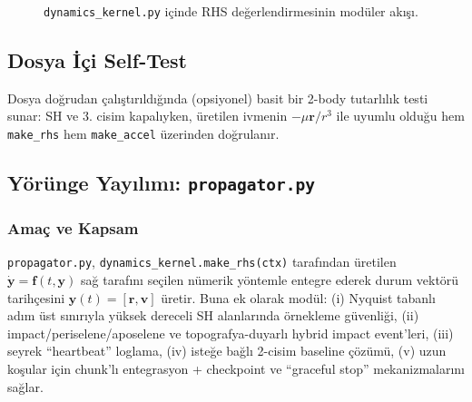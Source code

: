 \begin{figure}[H]
\centering
{}
\caption{\texttt{dynamics\_kernel.py} içinde RHS değerlendirmesinin modüler akışı.}
\end{figure}

\subsection*{Dosya İçi Self-Test}
Dosya doğrudan çalıştırıldığında (opsiyonel) basit bir 2-body tutarlılık testi sunar:
SH ve 3. cisim kapalıyken, üretilen ivmenin \(-\mu\mathbf{r}/r^3\) ile uyumlu olduğu
hem \texttt{make\_rhs} hem \texttt{make\_accel} üzerinden doğrulanır.


\newpage
\subsection{Yörünge Yayılımı: \texttt{propagator.py}}
\label{subsec:propagator}

\subsubsection*{Amaç ve Kapsam}
\texttt{propagator.py}, \texttt{dynamics\_kernel.make\_rhs(ctx)} tarafından üretilen
\(\dot{\mathbf y}=\mathbf f(t,\mathbf y)\) sağ tarafını seçilen nümerik yöntemle entegre ederek
durum vektörü tarihçesini \(\mathbf y(t)=[\mathbf r,\mathbf v]\) üretir.
Buna ek olarak modül:
(i) Nyquist tabanlı adım üst sınırıyla yüksek dereceli SH alanlarında örnekleme güvenliği,
(ii) impact/periselene/aposelene ve topografya-duyarlı hybrid impact event’leri,
(iii) seyrek ``heartbeat'' loglama,
(iv) isteğe bağlı 2-cisim baseline çözümü,
(v) uzun koşular için chunk’lı entegrasyon + checkpoint ve ``graceful stop''
mekanizmalarını sağlar.

